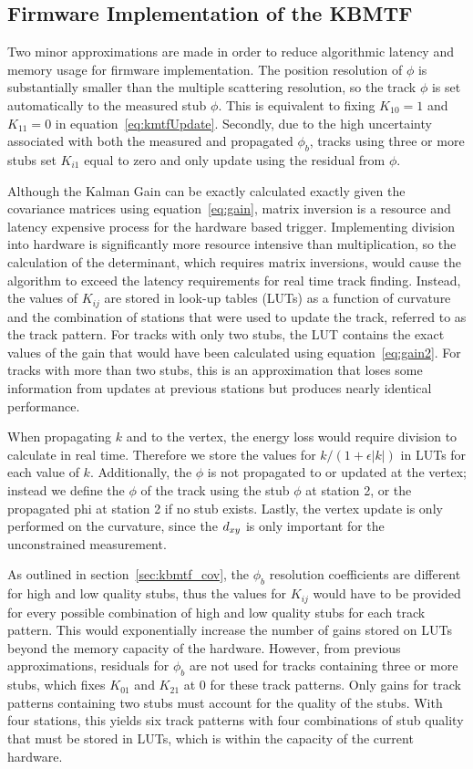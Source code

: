 \subsection{Firmware Implementation of the KBMTF} \label{sec:fw}
Two minor approximations are made in order to reduce algorithmic latency and memory usage for firmware implementation. The position resolution of $\phi$ is substantially smaller than the multiple scattering resolution, so the track $\phi$ is set automatically to the measured stub $\phi$. This is equivalent to fixing $K_{10}=1$ and $K_{11}=0$ in equation~\ref{eq:kmtfUpdate}. Secondly, due to the high uncertainty associated with both the measured and propagated $\phi_b$, tracks using three or more stubs set $K_{i1}$ equal to zero and only update using the residual from $\phi$.

Although the Kalman Gain can be exactly calculated exactly given the covariance matrices using equation~\ref{eq:gain}, matrix inversion is a resource and latency expensive process for the hardware based trigger. Implementing division into hardware is significantly more resource intensive than multiplication, so the calculation of the determinant, which requires matrix inversions, would cause the algorithm to exceed the latency requirements for real time track finding. Instead, the values of $K_{ij}$ are stored in look-up tables (LUTs) as a function of curvature and the combination of stations that were used to update the track, referred to as the track pattern. For tracks with only two stubs, the LUT contains the exact values of the gain that would have been calculated using equation~\ref{eq:gain2}. For tracks with more than two stubs, this is an approximation that loses some information from updates at previous stations but produces nearly identical performance.

When propagating $k$ and \dxy to the vertex, the energy loss would require division to calculate in real time. Therefore we store the values for $k/(1+\epsilon|k|)$ in LUTs for each value of $k$. Additionally, the $\phi$ is not propagated to or updated at the vertex; instead we define the $\phi$ of the track using the stub $\phi$ at station 2, or the propagated phi at station 2 if no stub exists. Lastly, the vertex update is only performed on the curvature, since the $d_{xy}$ is only important for the unconstrained measurement.

As outlined in section~\ref{sec:kbmtf_cov}, the $\phi_b$ resolution coefficients are different for high and low quality stubs, thus the values for $K_{ij}$ would have to be provided for every possible combination of high and low quality stubs for each track pattern. This would exponentially increase the number of gains stored on LUTs beyond the memory capacity of the hardware. However, from previous approximations, residuals for $\phi_b$ are not used for tracks containing three or more stubs, which fixes $K_{01}$ and $K_{21}$ at 0 for these track patterns. Only gains for track patterns containing two stubs must account for the quality of the stubs. With four stations, this yields six track patterns with four combinations of stub quality that must be stored in LUTs, which is within the capacity of the current hardware.

